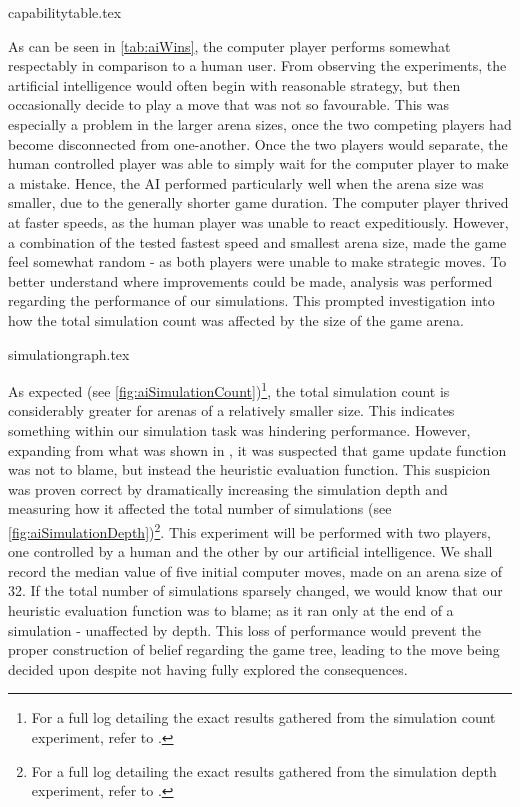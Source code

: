 \documentclass{standalone}
\begin{document}
		{capabilitytable.tex}

		As can be seen in \autoref{tab:aiWins}, the computer player performs somewhat respectably in comparison to a human user. From observing the experiments, the artificial intelligence would often begin with reasonable strategy, but then occasionally decide to play a move that was not so favourable. This was especially a problem in the larger arena sizes, once the two competing players had become disconnected from one-another. Once the two players would separate, the human controlled player was able to simply wait for the computer player to make a mistake. Hence, the AI performed particularly well when the arena size was smaller, due to the generally shorter game duration. The computer player thrived at faster speeds, as the human player was unable to react expeditiously. However, a combination of the tested fastest speed and smallest arena size, made the game feel somewhat random - as both players were unable to make strategic moves. To better understand where improvements could be made, analysis was performed regarding the performance of our simulations. This prompted investigation into how the total simulation count was affected by the size of the game arena.

		{simulationgraph.tex}
		\FloatBarrier

	 	As expected (see \autoref{fig:aiSimulationCount})\footnote{For a full log detailing the exact results gathered from the simulation count experiment, refer to .}, the total simulation count is considerably greater for arenas of a relatively smaller size. This indicates something within our simulation task was hindering performance. However, expanding from what was shown in , it was suspected that game update function was not to blame, but instead the heuristic evaluation function. This suspicion was proven correct by dramatically increasing the simulation depth and measuring how it affected the total number of simulations (see \autoref{fig:aiSimulationDepth})\footnote{For a full log detailing the exact results gathered from the simulation depth experiment, refer to .}. This experiment will be performed with two players, one controlled by a human and the other by our artificial intelligence. We shall record the median value of five initial computer moves, made on an arena size of 32. If the total number of simulations sparsely changed, we would know that our heuristic evaluation function was to blame; as it ran only at the end of a simulation - unaffected by depth. This loss of performance would prevent the proper construction of belief regarding the game tree, leading to the move being decided upon despite not having fully explored the consequences.
\end{document}
